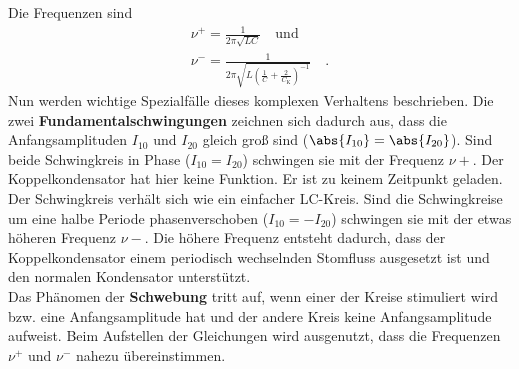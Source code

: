 Die Frequenzen sind
\begin{align}
\nu^+ = \frac{1}{2 \pi \sqrt{L C}} \quad \text{und} \label{Frequenz_p} \\
\nu^- = \frac{1}{2 \pi \sqrt{L\left(\frac{1}{C} + \frac{2}{C_\text{K}}\right)^{-1}}} \quad . \label{Frequenz_m}
\end{align}
Nun werden wichtige Spezialfälle dieses komplexen Verhaltens beschrieben. Die zwei \textbf{Fundamentalschwingungen} zeichnen sich dadurch aus, dass die Anfangsamplituden $I_{10}$ und $I_{20}$ gleich groß sind ($\abs{I_{10}} = \abs{I_{20}}$). Sind beide Schwingkreis in Phase ($I_{10}=I_{20}$) schwingen sie mit der Frequenz $\nu+$. Der Koppelkondensator hat hier keine Funktion. Er ist zu keinem Zeitpunkt geladen. Der Schwingkreis verhält sich wie ein einfacher LC-Kreis. Sind die Schwingkreise um eine halbe Periode phasenverschoben ($I_{10} = - I_{20}$) schwingen sie mit der etwas höheren Frequenz $\nu-$. Die höhere Frequenz entsteht dadurch, dass der Koppelkondensator einem periodisch wechselnden Stomfluss ausgesetzt ist und den normalen Kondensator unterstützt. \\
Das Phänomen der \textbf{Schwebung} tritt auf, wenn einer der Kreise stimuliert wird bzw. eine Anfangsamplitude hat und der andere Kreis keine Anfangsamplitude aufweist. Beim Aufstellen der Gleichungen wird ausgenutzt, dass die Frequenzen $\nu^+$ und $\nu^-$ nahezu übereinstimmen. \\


